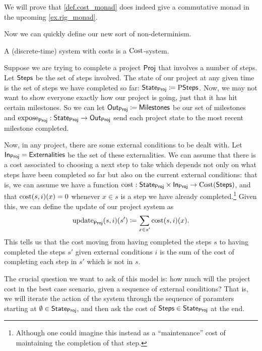 \documentclass[DynamicalBook]{subfiles}
\begin{document}
\begin{remark}
We will prove that \cref{def.cost_monad} does indeed give a commutative monad in
the upcoming \cref{ex.rig_monad}.
\end{remark}

Now we can quickly define our new sort of non-determinism.
\begin{definition}
A (discrete-time) system with costs is a $\mathrm{Cost}$-system.
\end{definition}


\begin{example}
  Suppose we are trying to complete a project $\mathsf{Proj}$ that involves a number of steps.
  Let $\mathsf{Steps}$ be the set of steps involved. The state of our project at any given
  time is the set of steps we have completed so far: $\mathsf{State}_{\mathsf{Proj}} \coloneqq
  \mathrm{P}\mathsf{Steps}$. Now, we may not want to show everyone exactly how our
  project is going, just that it has hit certain milestones. So we can let
  $\mathsf{Out}_{\mathsf{Proj}} \coloneqq \mathsf{Milestones}$ be our set of milestones and
  $\mathrm{expose}_{\mathsf{Proj}} : \mathsf{State}_{\mathsf{Proj}} \to \mathsf{Out}_{\mathsf{Proj}}$ send each project state to the
  most recent milestone completed.

  Now, in any project, there are some external conditions
  to be dealt with. Let $\mathsf{In}_{\mathsf{Proj}} = \mathsf{Externalities}$
  be the set of these externalities. We can assume that there is a cost
  associated to choosing a next step to take which depends not only on what
  steps have been completed so far but also on the current external conditions:
  that is, we can assume we have a function $\mathrm{cost} : \mathsf{State}_{\mathsf{Proj}} \times
  \mathsf{In}_{\mathsf{Proj}} \to \mathrm{Cost}(\mathsf{Steps})$, and that $\mathrm{cost}(s, i)(x) = 0$
  whenever $x \in s$ is a step we have already completed.\footnote{Although one
    could imagine this instead as a ``maintenance'' cost of maintaining the
    completion of that step.} Given this, we can define the update
  of our project system as
  \[
\mathrm{update}_{\mathsf{Proj}}(s, i)(s') \coloneqq \sum_{x \in s'} \mathrm{cost}(s,
  i)(x).
  \]
  This tells us that the cost moving from having completed the steps $s$ to
  having completed the steps $s'$ given external conditions $i$ is the sum of
  the cost of completing each step in $s'$ which is not in $s$.

  The crucial question we want to ask of this model is: how much will the
  project cost in the best case scenario, given a sequence of external
  conditions? That is, we will iterate the action of the system through the
  sequence of paramters starting at
  $\emptyset \in \mathsf{State}_{\mathsf{Proj}}$, and then ask the cost of $\mathsf{Steps} \in
  \mathsf{State}_{\mathsf{Proj}}$ at the end. 
\end{example}
\end{document}
